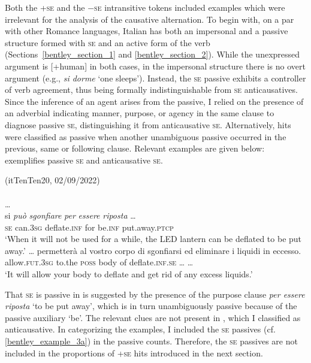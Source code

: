 \documentclass[output=paper,colorlinks,citecolor=brown
]{langscibook}
\begin{document}
Both the +\textsc{se} and the −\textsc{se} intransitive tokens included examples which were irrelevant for the analysis of the causative alternation. To begin with, on a par with other Romance languages, Italian has both an impersonal and a passive structure formed with \textsc{se} and an active form of the verb (Sections~\ref{bentley_section_1} and \ref{bentley_section_2}). While the unexpressed argument is [+human] in both cases, in the impersonal structure there is no overt argument (e.g., \textit{si dorme} ‘one sleeps’). Instead, the \textsc{se} passive exhibits a controller of verb agreement, thus being formally indistinguishable from \textsc{se} anticausatives. Since the inference of an agent arises from the passive, I relied on the presence of an adverbial indicating manner, purpose, or agency in the same clause to diagnose passive \textsc{se}, distinguishing it from anticausative \textsc{se}. Alternatively, hits were classified as passive when another unambiguous passive occurred in the previous, same or following clause. Relevant examples are given below:  exemplifies passive \textsc{se} and  anticausative \textsc{se}.

\ea \label{bentley_example_3}(itTenTen20, 02/09/2022)\\
    \ea \label{bentley_example_3a}
     \\
    {}\ldots\\
    \gll si \textit{può} \textit{sgonfiare} \textit{per} \textit{essere} \textit{riposta} \ldots\\
    \textsc{se} can.3\textsc{sg} deflate.\textsc{inf} for be.\textsc{inf} put.away.\textsc{ptcp}\\
    \glt ‘When it will not be used for a while, the LED lantern can be deflated to be put away.’
    \ex \label{bentley_example_3b}
    \gll  \ldots{}  permetterà al vostro corpo di sgonfiarsi ed {eliminare i liquidi in eccesso.}\\
          {}        allow.\textsc{fut}.3\textsc{sg} to.the \textsc{poss} body of deflate.\textsc{inf}.\textsc{se} {\ldots} {\ldots}\\
    \glt ‘It will allow your body to deflate and get rid of any excess liquids.’
    \z
\z

That \textsc{se} is passive in  is suggested by the presence of the purpose clause \textit{per essere riposta} ‘to be put away’, which is in turn unambiguously passive because of the passive auxiliary ‘be’. The relevant clues are not present in , which I classified as anticausative. In categorizing the examples, I included the \textsc{se} passives (cf. \ref{bentley_example_3a}) in the passive counts. Therefore, the \textsc{se} passives are not included in the proportions of +\textsc{se} hits introduced in the next section. 
\end{document}

